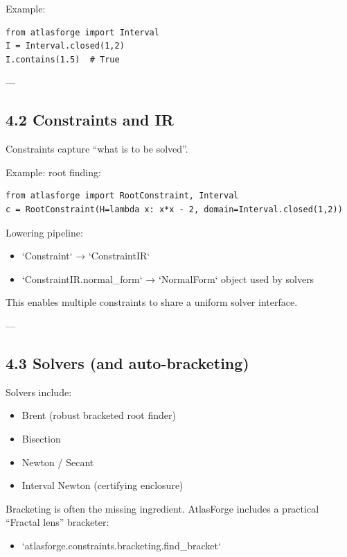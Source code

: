 \documentclass[11pt]{article}
\begin{document}
Example:

\begin{lstlisting}
from atlasforge import Interval
I = Interval.closed(1,2)
I.contains(1.5)  # True
\end{lstlisting}

---

\subsection{4.2 Constraints and IR}

Constraints capture “what is to be solved”.

Example: root finding:

\begin{lstlisting}
from atlasforge import RootConstraint, Interval
c = RootConstraint(H=lambda x: x*x - 2, domain=Interval.closed(1,2))
\end{lstlisting}

Lowering pipeline:
\begin{itemize}
\item `Constraint` → `ConstraintIR`
\item `ConstraintIR.normal\_form` → `NormalForm` object used by solvers
\end{itemize}

This enables multiple constraints to share a uniform solver interface.

---

\subsection{4.3 Solvers (and auto-bracketing)}

Solvers include:
\begin{itemize}
\item Brent (robust bracketed root finder)
\item Bisection
\item Newton / Secant
\item Interval Newton (certifying enclosure)
\end{itemize}

Bracketing is often the missing ingredient. AtlasForge includes a practical “Fractal lens” bracketer:

\begin{itemize}
\item `atlasforge.constraints.bracketing.find\_bracket`
\end{itemize}
\end{document}
